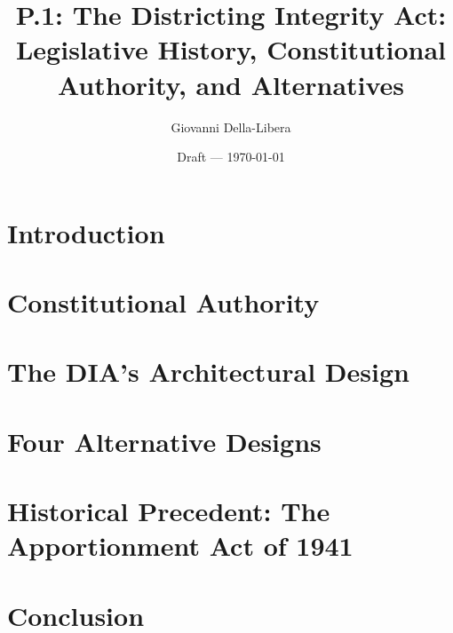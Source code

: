 \documentclass[12pt]{article}
\title{P.1: The Districting Integrity Act:\\
       Legislative History, Constitutional Authority, and Alternatives}
\author{Giovanni Della-Libera}
\date{Draft --- \today}
\begin{document}
\maketitle

\begin{abstract}

\end{abstract}

\newpage
\tableofcontents
\newpage

\section{Introduction}


\section{Constitutional Authority}


\section{The DIA's Architectural Design}


\section{Four Alternative Designs}


\section{Historical Precedent: The Apportionment Act of 1941}


\section{Conclusion}




\end{document}
